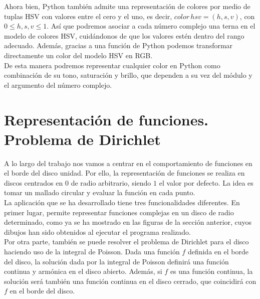 Ahora bien, Python también admite una representación de colores por medio de tuplas HSV con valores entre el cero y el uno, es decir, $color \, hsv = (h, s, v)$, con $0 \leq h, s, v \leq 1$. Así que podremos asociar a cada número complejo una terna en el modelo de colores HSV, cuidándonos de que los valores estén dentro del rango adecuado. Además, gracias a una función de Python podemos transformar directamente un color del modelo HSV en RGB. \\

De esta manera podremos representar cualquier color en Python como combinación de su tono, saturación y brillo, que dependen a su vez del módulo y el argumento del número complejo. \\


\section{Representación de funciones. Problema de Dirichlet}

A lo largo del trabajo nos vamos a centrar en el comportamiento de funciones en el borde del disco unidad. Por ello, la representación de funciones se realiza en discos centrados en $0$ de radio arbitrario, siendo $1$ el valor por defecto. La idea es tomar un mallado circular y evaluar la función en cada punto. \\

La aplicación que se ha desarrollado tiene tres funcionalidades diferentes. En primer lugar, permite representar funciones complejas en un disco de radio determinado, como ya se ha mostrado en las figuras de la sección anterior, cuyos dibujos han sido obtenidos al ejecutar el programa realizado. \\

Por otra parte, también se puede resolver el problema de Dirichlet para el disco haciendo uso de la integral de Poisson. Dada una función $f$ definida en el borde del disco, la solución dada por la integral de Poisson definirá una función continua y armónica en el disco abierto. Además, si $f$ es una función continua, la solución será también una función continua en el disco cerrado, que coincidirá con $f$ en el borde del disco. \\

